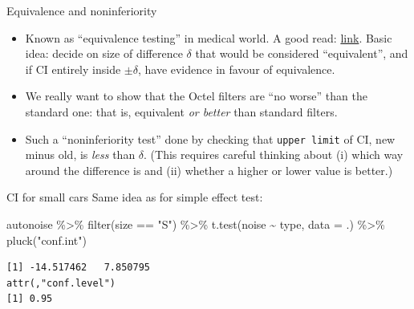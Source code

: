 \documentclass[
  ignorenonframetext,
]{beamer}
\newenvironment{Shaded}{\begin{snugshade}}{\end{snugshade}}
\newcommand{\AttributeTok}[1]{\textcolor[rgb]{0.40,0.45,0.13}{#1}}
\newcommand{\FunctionTok}[1]{\textcolor[rgb]{0.28,0.35,0.67}{#1}}
\newcommand{\NormalTok}[1]{\textcolor[rgb]{0.00,0.23,0.31}{#1}}
\newcommand{\SpecialCharTok}[1]{\textcolor[rgb]{0.37,0.37,0.37}{#1}}
\newcommand{\StringTok}[1]{\textcolor[rgb]{0.13,0.47,0.30}{#1}}
\begin{document}
\begin{frame}[fragile]{Equivalence and noninferiority}
\protect\hypertarget{equivalence-and-noninferiority}{}
\begin{itemize}
\item
  Known as ``equivalence testing'' in medical world. A good read:
  \href{http://www.ncbi.nlm.nih.gov/pmc/articles/PMC3019319/}{link}.
  Basic idea: decide on size of difference \(\delta\) that would be
  considered ``equivalent'', and if CI entirely inside \(\pm \delta\),
  have evidence in favour of equivalence.
\item
  We really want to show that the Octel filters are ``no worse'' than
  the standard one: that is, equivalent \emph{or better} than standard
  filters.
\item
  Such a ``noninferiority test'' done by checking that
  \texttt{upper\ limit} of CI, new minus old, is \emph{less} than
  \(\delta\). (This requires careful thinking about (i) which way around
  the difference is and (ii) whether a higher or lower value is better.)
\end{itemize}
\end{frame}

\begin{frame}[fragile]{CI for small cars}
\protect\hypertarget{ci-for-small-cars}{}
Same idea as for simple effect test:

\begin{Shaded}
\begin{Highlighting}[]
\NormalTok{autonoise }\SpecialCharTok{\%\textgreater{}\%}
  \FunctionTok{filter}\NormalTok{(size }\SpecialCharTok{==} \StringTok{"S"}\NormalTok{) }\SpecialCharTok{\%\textgreater{}\%}
  \FunctionTok{t.test}\NormalTok{(noise }\SpecialCharTok{\textasciitilde{}}\NormalTok{ type, }\AttributeTok{data =}\NormalTok{ .) }\SpecialCharTok{\%\textgreater{}\%}
  \FunctionTok{pluck}\NormalTok{(}\StringTok{"conf.int"}\NormalTok{)}
\end{Highlighting}
\end{Shaded}

\begin{verbatim}
[1] -14.517462   7.850795
attr(,"conf.level")
[1] 0.95
\end{verbatim}
\end{frame}
\end{document}
